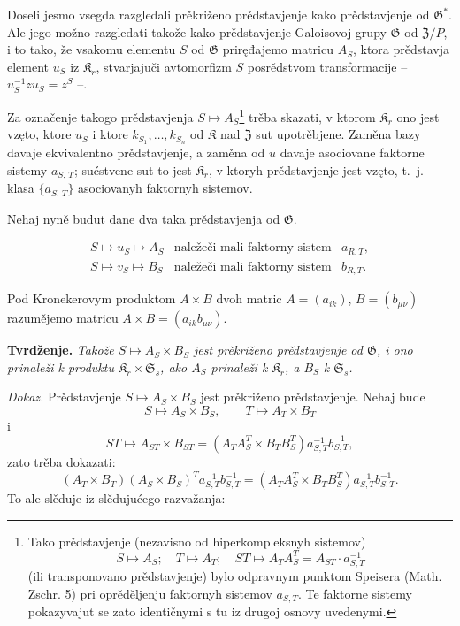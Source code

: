 \documentclass[11pt]{article}
\newcommand{\srcfn}[2]{\footnote{#2}}
\begin{document}
Doseli jesmo vsegda razgledali prěkriženo prědstavjenje kako prědstavjenje od \(\mathfrak{G}^*\). Ale jego možno razgledati takože kako prědstavjenje Galoisovoj grupy \(\mathfrak{G}\) od \(\mathfrak Z/P\), i to tako, že vsakomu elementu \(S\) od \(\mathfrak{G}\) priręđajemo matricu \(A_S\), ktora prědstavja element \(u_S\) iz \(\mathfrak K_r\), stvarjajuči avtomorfizm \(S\) posrědstvom transformacije -- \(u_S^{-1}zu_S=z^S\) --.

Za označenje takogo prědstavjenja \(S\mapsto A_S\)\srcfn{1}{Tako prědstavjenje (nezavisno od hiperkompleksnyh sistemov)
\[
S\mapsto A_S;\quad T\mapsto A_T;\quad ST\mapsto A_TA_S^T=A_{ST}\cdot a_{S,T}^{-1}
\]
(ili transponovano prědstavjenje) bylo odpravnym punktom Speisera (Math. Zschr. 5) pri oprěděljenju faktornyh sistemov \(a_{S,T}\). Te faktorne sistemy pokazyvajut se zato identičnymi s tu iz drugoj osnovy uvedenymi.} trěba skazati, v ktorom \(\mathfrak K_r\) ono jest vzęto, ktore \(u_S\) i ktore \(k_{S_1},\ldots,k_{S_n}\) od \(\mathfrak K\) nad \(\mathfrak Z\) sut upotrěbjene. Zaměna bazy davaje ekvivalentno prědstavjenje, a zaměna od \(u\) davaje asociovane faktorne sistemy \(a_{S,\,T}\); sućstvene sut to jest \(\mathfrak K_r\), v ktoryh prědstavjenje jest vzęto, t.~j. klasa \(\{a_{S,\,T}\}\) asociovanyh faktornyh sistemov.

Nehaj nyně budut dane dva taka prědstavjenja od \(\mathfrak G\).

\[
\begin{array}{lll}
S\mapsto u_S\mapsto A_S & \text{naležeči mali faktorny sistem} & a_{R,T},\\
S\mapsto v_S\mapsto B_S & \text{naležeči mali faktorny sistem} & b_{R,T}.
\end{array}
\]

Pod Kronekerovym produktom \(A\times B\) dvoh matric \(A=(a_{ik})\), \(B=(b_{\mu\nu})\) razumějemo matricu \(A\times B=(a_{ik}b_{\mu\nu})\).

\noindent\textbf{Tvrdženje.} \emph{Takože \(S\mapsto A_S\times B_S\) jest prěkriženo prědstavjenje od \(\mathfrak G\), i ono prinaleži k produktu \(\mathfrak K_r\times\mathfrak S_s\), ako \(A_S\) prinaleži k \(\mathfrak K_r\), a \(B_S\) k \(\mathfrak S_s\).}

\noindent\emph{Dokaz.} Prědstavjenje \(S\mapsto A_S\times B_S\) jest prěkriženo prědstavjenje. Nehaj bude
\[
S\mapsto A_S\times B_S,\qquad T\mapsto A_T\times B_T
\]
i
\[
ST\mapsto A_{ST}\times B_{ST}
=(A_TA_S^T\times B_TB_S^T)a_{S,T}^{-1}b_{S,T}^{-1},
\]
zato trěba dokazati:
\[
(A_T\times B_T)(A_S\times B_S)^T a_{S,T}^{-1}b_{S,T}^{-1}
=(A_TA_S^T\times B_TB_S^T)a_{S,T}^{-1}b_{S,T}^{-1}.
\]
To ale slěduje iz slědujućego razvažanja:
\end{document}
